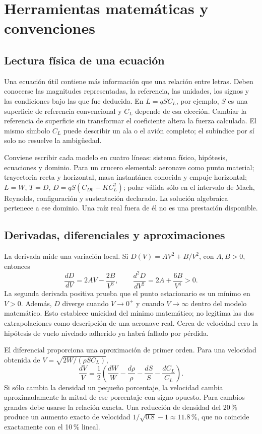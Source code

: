 \appendix
\chapter{Herramientas matemáticas y convenciones}\label{ap:matematicas}
\section{Lectura física de una ecuación}
Una ecuación útil contiene más información que una relación entre letras. Deben conocerse las magnitudes representadas, la referencia, las unidades, los signos y las condiciones bajo las que fue deducida. En $L=qSC_L$, por ejemplo, $S$ es una superficie de referencia convencional y $C_L$ depende de esa elección. Cambiar la referencia de superficie sin transformar el coeficiente altera la fuerza calculada. El mismo símbolo $C_L$ puede describir un ala o el avión completo; el subíndice por sí solo no resuelve la ambigüedad.

Conviene escribir cada modelo en cuatro líneas: sistema físico, hipótesis, ecuaciones y dominio. Para un crucero elemental: aeronave como punto material; trayectoria recta y horizontal, masa instantánea conocida y empuje horizontal; $L=W$, $T=D$, $D=qS(C_{D0}+KC_L^2)$; polar válida sólo en el intervalo de Mach, Reynolds, configuración y sustentación declarado. La solución algebraica pertenece a ese dominio. Una raíz real fuera de él no es una prestación disponible.

\section{Derivadas, diferenciales y aproximaciones}
La derivada mide una variación local. Si $D(V)=AV^2+B/V^2$, con $A,B>0$, entonces
\begin{equation}
\frac{dD}{dV}=2AV-\frac{2B}{V^3},\qquad
\frac{d^2D}{dV^2}=2A+\frac{6B}{V^4}>0.
\end{equation}
La segunda derivada positiva prueba que el punto estacionario es un mínimo en $V>0$. Además, $D$ diverge cuando $V\to0^+$ y cuando $V\to\infty$ dentro del modelo matemático. Esto establece unicidad del mínimo matemático; no legitima las dos extrapolaciones como descripción de una aeronave real. Cerca de velocidad cero la hipótesis de vuelo nivelado adherido ya habrá fallado por pérdida.

El diferencial proporciona una aproximación de primer orden. Para una velocidad obtenida de $V=\sqrt{2W/(\rho SC_L)}$,
\begin{equation}
\frac{dV}{V}=\frac12\left(\frac{dW}{W}-\frac{d\rho}{\rho}-\frac{dS}{S}-\frac{dC_L}{C_L}\right).
\end{equation}
Si sólo cambia la densidad un pequeño porcentaje, la velocidad cambia aproximadamente la mitad de ese porcentaje con signo opuesto. Para cambios grandes debe usarse la relación exacta. Una reducción de densidad del 20\,\% produce un aumento exacto de velocidad $1/\sqrt{0.8}-1\approx11.8\,\%$, que no coincide exactamente con el 10\,\% lineal.

